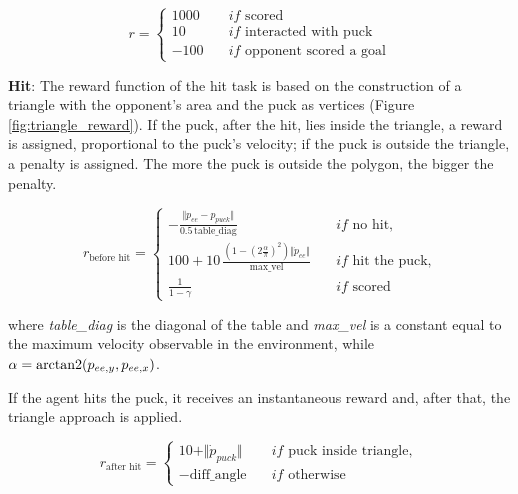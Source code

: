 \begin{equation*}
    r = \left\{
        \begin{aligned}
            1000 \quad &if \text{ scored} \\
            10  \quad &if \text{ interacted with puck} \\
            -100 \quad &if \text{ opponent scored a goal}
        \end{aligned}
    \right.
\end{equation*}

\textbf{Hit}:
The reward function of the hit task is based on the construction of a triangle with the opponent's area and the puck as vertices (Figure \ref{fig:triangle_reward}).
If the puck, after the hit, lies inside the triangle, a reward is assigned, proportional to the puck's velocity; if the puck is outside the triangle, a penalty is assigned.
The more the puck is outside the polygon, the bigger the penalty.

\begin{equation*}
    r_{\text{before hit}} = \left\{
        \begin{aligned}
            -\frac{\Vert p_{ee} - p_{puck} \Vert}{0.5 \, \text{table\_diag}} \quad &if \text{ no hit,} \\
            100 + 10\,\frac{\left(1 - \left(2\frac{\alpha}{\pi}\right)^2\right)\Vert \dot{p}_{ee} \Vert}{\text{max\_vel}} \quad &if \text{ hit the puck,} \\
            \frac{1}{1 - \gamma} \quad &if \text{ scored}
        \end{aligned}
    \right.
\end{equation*}

where \textit{table\_diag} is the diagonal of the table and \textit{max\_vel} is a constant equal to the maximum velocity observable in the environment,
while $\alpha = \operatorname{arctan2}(p_{ee,y}, p_{ee,x})$.

If the agent hits the puck, it receives an instantaneous reward and, after that, the triangle approach is applied.

\begin{equation*}
    r_{\text{after hit}} = \left\{
        \begin{aligned}
            10 + \Vert \dot{p}_{puck} \Vert \quad  &if \text{ puck inside triangle}, \\
            -\text{diff\_angle} \quad              &if \text{ otherwise} 
        \end{aligned}
    \right.
    \end{equation*}


